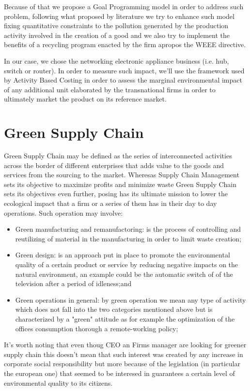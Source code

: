 \documentclass{article}
\begin{document}
Because of that we propose a Goal Programming model in order to address such problem, following what proposed by literature we try to enhance such model fixing quantitative constraints to the pollution generated by the production activity involved in the creation of a good and we also try to implement the benefits of a recycling program enacted by the firm apropos the WEEE directive.

In our case, we chose the networking electronic appliance business (i.e. hub, switch or router). In order to measure such impact, we'll use the framework used by Activity Based Costing in order to assess the marginal environmental impact of any additional unit elaborated by the transnational firms in order to ultimately market the product on its reference market.

\section{Green Supply Chain}
Green Supply Chain may be defined as the series of interconnected activities across the border of different enterprises that adds value to the goods and services from the sourcing to the market. Wheresas Supply Chain Management sets its objective to maximize profits and minimize waste Green Supply Chain sets its objectives even further, posing has its ultimate mission to lower the ecological impact that a firm or a series of them has in their day to day operations. Such operation may involve:
  \begin{itemize}
    \item Green manufacturing and remanufactoring: is the process of controlling and reutilizing of material in the manufacturing in order to limit waste creation\cite{urvashi_green_2013};
    \item Green design: is an approach put in place to promote the environmental quality of a certain product or service  by reducing negative impacts on the natural environment, an example could be the automatic switch of of the television after a period of idleness\cite{ceschin_evolution_2016};and
    \item Green operations in general: by green operation we mean any type of activity which does not fall into the two categories mentioned above but is characterized by a "green" attitude as for example the optimization of the offices consumption thorough a remote-working policy;
  \end{itemize}

It's worth noting that even thoug CEO an Firms manager are looking for greener supply chain this doesn't mean that such interest was created by any increase in corporate social responsibility but more because of the legislation (in particular the european one) that seemed to be interesed in guarantees a certain level of environmental quality to its citizens.
\end{document}
